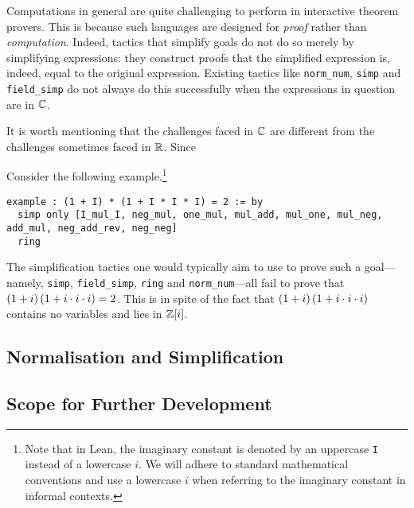 Computations in general are quite challenging to perform in interactive theorem provers. This is because such languages are designed for \textit{proof} rather than \textit{computation}. Indeed, tactics that simplify goals do not do so merely by simplifying expressions: they construct proofs that the simplified expression is, indeed, equal to the original expression. Existing tactics like \lstinline|norm_num|, \lstinline|simp| and \lstinline|field_simp| do not always do this successfully when the expressions in question are in $\mathbb{C}$.

It is worth mentioning that the challenges faced in $\mathbb{C}$ are different from the challenges sometimes faced in $\mathbb{R}$. Since

Consider the following example.\footnote{Note that in Lean, the imaginary constant is denoted by an uppercase \lstinline|I| instead of a lowercase $i$. We will adhere to standard mathematical conventions and use a lowercase $i$ when referring to the imaginary constant in informal contexts.}

\begin{lstlisting}[caption={A nontrivial computation in $\C$, done formally}, label=Ch5:Listing:long_tactic_pf_example]
example : (1 + I) * (1 + I * I * I) = 2 := by
  simp only [I_mul_I, neg_mul, one_mul, mul_add, mul_one, mul_neg, add_mul, neg_add_rev, neg_neg]
  ring
\end{lstlisting}

The simplification tactics one would typically aim to use to prove such a goal---namely, \lstinline|simp|, \lstinline|field_simp|, \lstinline|ring| and \lstinline|norm_num|---all fail to prove that $\left( 1 + i \right)\left( 1 + i \cdot i \cdot i \right) = 2$. This is in spite of the fact that $\left( 1 + i \right)\left( 1 + i \cdot i \cdot i \right)$ contains no variables and lies in $\mathbb{Z}[i]$.

\subsection{Normalisation and Simplification}

\subsection{Scope for Further Development}